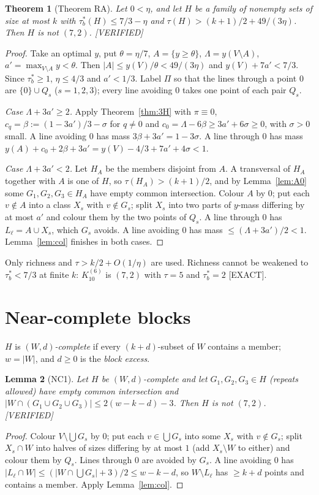 \documentclass[11pt]{article}
\newtheorem{theorem}{Theorem}[section]
\newtheorem{lemma}[theorem]{Lemma}
\theoremstyle{definition}
\newcommand{\st}[1]{\textsf{\small[#1]}}
\begin{document}
\begin{theorem}[Theorem RA]\label{thm:RA}
Let $0<\eta$, and let $H$ be a family of nonempty sets of size at most $k$ with $\tau^*_b(H)\le7/3-\eta$ and
$\tau(H)>(k+1)/2+49/(3\eta)$. Then $H$ is not $(7,2)$. \st{VERIFIED}
\end{theorem}
\begin{proof}
Take an optimal $y$, put $\theta=\eta/7$, $A=\{y\ge\theta\}$, $\Lambda=y(V\setminus A)$, $a'=\max_{V\setminus A}y<\theta$.
Then $|A|\le y(V)/\theta<49/(3\eta)$ and $y(V)+7a'<7/3$. Since $\tau^*_b\ge1$, $\eta\le4/3$ and $a'<1/3$. Label $\Pi$
so that the lines through a point $0$ are $\{0\}\cup Q_s$ ($s=1,2,3$); every line avoiding $0$ takes one point of each
pair $Q_s$.

\emph{Case $\Lambda+3a'\ge2$.} Apply Theorem~\ref{thm:3H} with $\pi\equiv0$, $c_q=\beta:=(1-3a')/3-\sigma$ for $q\ne0$
and $c_0=\Lambda-6\beta\ge3a'+6\sigma\ge0$, with $\sigma>0$ small. A line avoiding $0$ has mass $3\beta+3a'=1-3\sigma$.
A line through $0$ has mass $y(A)+c_0+2\beta+3a'=y(V)-4/3+7a'+4\sigma<1$.

\emph{Case $\Lambda+3a'<2$.} Let $H_A$ be the members disjoint from $A$. A transversal of $H_A$ together with $A$ is one
of $H$, so $\tau(H_A)>(k+1)/2$, and by Lemma~\ref{lem:A0} some $G_1,G_2,G_3\in H_A$ have empty common intersection.
Colour $A$ by $0$; put each $v\notin A$ into a class $X_s$ with $v\notin G_s$; split $X_s$ into two parts of $y$-mass
differing by at most $a'$ and colour them by the two points of $Q_s$. A line through $0$ has $L_\ell=A\cup X_s$, which
$G_s$ avoids. A line avoiding $0$ has mass $\le(\Lambda+3a')/2<1$. Lemma~\ref{lem:col} finishes in both cases.
\end{proof}
Only richness and $\tau>k/2+O(1/\eta)$ are used. Richness cannot be weakened to $\tau^*_b<7/3$ at finite $k$:
$K^{(6)}_{10}$ is $(7,2)$ with $\tau=5$ and $\tau^*_b=2$ \st{EXACT}.

\section{Near-complete blocks}\label{sec:NC}

$H$ is \emph{$(W,d)$-complete} if every $(k+d)$-subset of $W$ contains a member; $w=|W|$, and $d\ge0$ is the
\emph{block excess}.

\begin{lemma}[NC1]\label{lem:NC1}
Let $H$ be $(W,d)$-complete and let $G_1,G_2,G_3\in H$ (repeats allowed) have empty common intersection and
$|W\cap(G_1\cup G_2\cup G_3)|\le2(w-k-d)-3$. Then $H$ is not $(7,2)$. \st{VERIFIED}
\end{lemma}
\begin{proof}
Colour $V\setminus\bigcup G_s$ by $0$; put each $v\in\bigcup G_s$ into some $X_s$ with $v\notin G_s$; split
$X_s\cap W$ into halves of sizes differing by at most $1$ (add $X_s\setminus W$ to either) and colour them by $Q_s$.
Lines through $0$ are avoided by $G_s$. A line avoiding $0$ has $|L_\ell\cap W|\le(|W\cap\bigcup G_s|+3)/2\le w-k-d$,
so $W\setminus L_\ell$ has $\ge k+d$ points and contains a member. Apply Lemma~\ref{lem:col}.
\end{proof}
\end{document}
